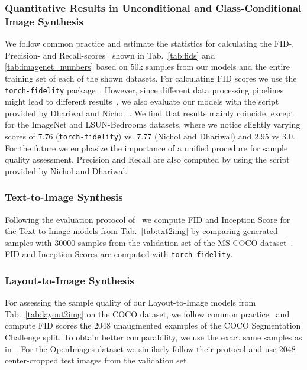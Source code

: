 \documentclass[10pt,twocolumn,letterpaper]{article}
\begin{document}
\subsubsection{Quantitative Results in Unconditional and Class-Conditional Image Synthesis}
\label{suppsubsubsec:fids}
We follow common practice and estimate the statistics for calculating the FID-, Precision- and Recall-scores~\cite{FID,DBLP:journals/corr/abs-1904-06991} shown in Tab.~\ref{tab:fids} and \ref{tab:imagenet_numbers} based on 50k samples from our models and the entire training set of each of the shown datasets. For calculating FID scores we use the \texttt{torch-fidelity} package~\cite{obukhov2020torchfidelity}. However, since different data processing pipelines might lead to different results~\cite{parmar2021cleanfid}, we also evaluate our models with the script provided by Dhariwal and Nichol~\cite{DBLP:journals/corr/abs-2105-05233}. We find that results mainly coincide, except for the ImageNet and LSUN-Bedrooms datasets, where we notice slightly varying scores of 7.76 (\texttt{torch-fidelity}) vs. 7.77 (Nichol and Dhariwal) and 2.95 vs 3.0. For the future we emphasize the importance of a unified procedure for sample quality assessment. Precision and Recall are also computed by using the script provided by Nichol and Dhariwal.

\subsubsection{Text-to-Image Synthesis}
\label{suppsubsubsec:text2img}
Following the evaluation protocol of~\cite{DBLP:journals/corr/abs-2102-12092} we compute FID and Inception Score for the Text-to-Image models from Tab.~\ref{tab:txt2img} by comparing generated samples with 30000 samples from the validation set of the MS-COCO dataset~\cite{DBLP:journals/corr/LinMBHPRDZ14}. FID and Inception Scores are computed with \texttt{torch-fidelity}.

\subsubsection{Layout-to-Image Synthesis}
\label{suppsubsubsec:layout2img}
For assessing the sample quality of our Layout-to-Image models from Tab.~\ref{tab:layout2img} on the COCO dataset, we follow common practice~\cite{DBLP:conf/aaai/SylvainZBH021,DBLP:journals/corr/abs-2105-06458,DBLP:journals/corr/abs-2003-11571} and compute FID scores the 2048 unaugmented examples of the COCO Segmentation Challenge split. To obtain better comparability, we use the exact same samples as in~\cite{DBLP:journals/corr/abs-2105-06458}. For the OpenImages dataset we similarly follow their protocol and use 2048 center-cropped test images from the validation set.
\end{document}
